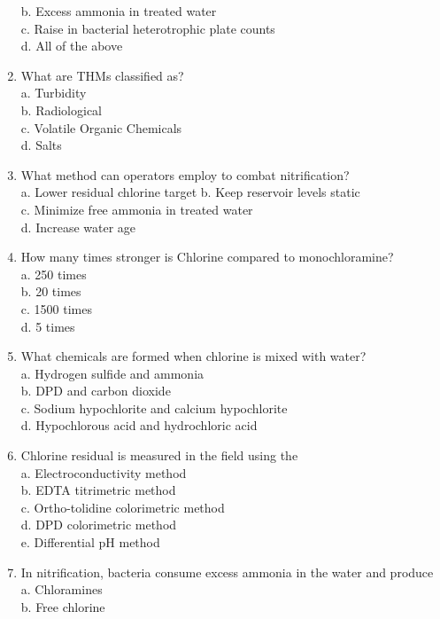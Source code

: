 \begin{enumerate}[1.]
b. Excess ammonia in treated water\\
c. Raise in bacterial heterotrophic plate counts\\
d. All of the above\\
\item What are THMs classified as?\\
a. Turbidity\\
b. Radiological\\
c. Volatile Organic Chemicals\\
d. Salts\\
\item What method can operators employ to combat nitrification?\\
a. Lower residual chlorine target b. Keep reservoir levels static\\
c. Minimize free ammonia in treated water\\
d. Increase water age\\
\item How many times stronger is Chlorine compared to monochloramine?\\
a. 250 times\\
b. 20 times\\
c. 1500 times\\
d. 5 times\\
\item What chemicals are formed when chlorine is mixed with water?\\
a. Hydrogen sulfide and ammonia\\
b. DPD and carbon dioxide\\
c. Sodium hypochlorite and calcium hypochlorite\\
d. Hypochlorous acid and hydrochloric acid\\
\item Chlorine residual is measured in the field using the\\
a. Electroconductivity method\\
b. EDTA titrimetric method\\
c. Ortho-tolidine colorimetric method\\
d. DPD colorimetric method\\
e. Differential $\mathrm{pH}$ method\\
\item In nitrification, bacteria consume excess ammonia in the water and produce\\
a. Chloramines\\
b. Free chlorine\\

\end{enumerate}
